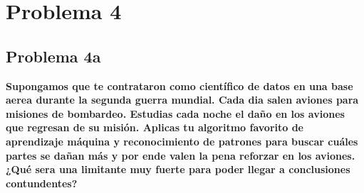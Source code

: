 \section*{Problema 4}
\subsection*{Problema 4a}

\textbf{Supongamos que te contrataron como científico de datos en una base aerea durante la segunda guerra mundial. Cada dia salen aviones para misiones de bombardeo. Estudias cada noche el daño en los aviones que regresan de su misión. Aplicas tu algoritmo favorito de aprendizaje máquina y reconocimiento de patrones para buscar cuáles partes se dañan más y por ende valen la pena reforzar en los aviones. ¿Qué sera una limitante muy fuerte para poder llegar a conclusiones contundentes?
}